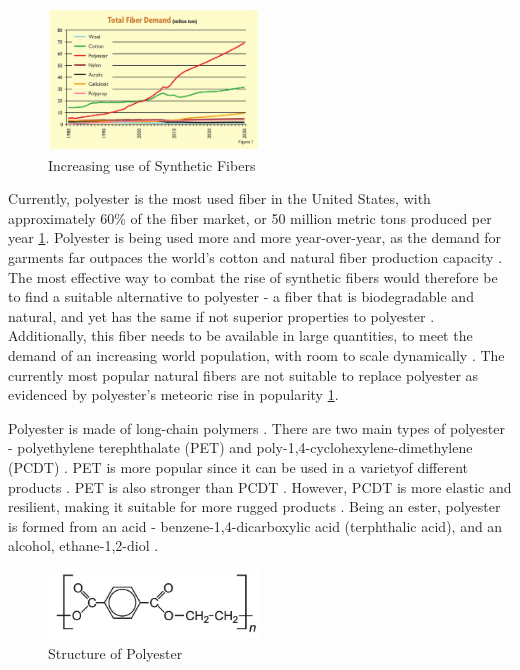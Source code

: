 \documentclass{article}
\begin{document}
\begin{figure}
  \centering
  \includegraphics[width=0.5\textwidth]{assets/polyester_rise.jpg}
  \caption{Increasing use of Synthetic Fibers \protect\autocite{globaltradeanalysis}}
  \label{fig:syntheticfiberuse}
\end{figure}

Currently, polyester is the most used fiber in the United States, with approximately 60\% of the fiber market, or 50 million metric tons produced per year \ref{fig:syntheticfiberuse}\autocite{globaltradeanalysis}. Polyester is being used more and more year-over-year, as the demand for garments far outpaces the world's cotton and natural fiber production capacity \autocite{globaltradeanalysis}. The most effective way to combat the rise of synthetic fibers would therefore be to find a suitable alternative to polyester - a fiber that is biodegradable and natural, and yet has the same if not superior properties to polyester \autocite{naturalfiberprogressreport}. Additionally, this fiber needs to be available in large quantities, to meet the demand of an increasing world population, with room to scale dynamically \autocite{grandviewresearch}. The currently most popular natural fibers are not suitable to replace polyester as evidenced by polyester's meteoric rise in popularity \ref{fig:syntheticfiberuse}.

Polyester is made of long-chain polymers \autocite{polyesterstrength}. There are two main types of polyester - polyethylene terephthalate (PET) and poly-1,4-cyclohexylene-dimethylene (PCDT) \autocite{polyesterstrength}. PET is more popular since it can be used in a varietyof different products \autocite{polyesterstrength}. PET is also stronger than PCDT \autocite{craftechindustries}. However, PCDT is more elastic and resilient, making it suitable for more rugged products \autocite{polyesterstrength}. Being an ester, polyester is formed from an acid - benzene-1,4-dicarboxylic acid (terphthalic acid), and an alcohol, ethane-1,2-diol \autocite{polyesterstructure}.

\begin{figure}
  \centering
  \includegraphics[width=0.5\textwidth]{assets/polyester_structure.jpg}
  \caption{Structure of Polyester \protect\autocite{polyesterstructure}}
  \label{fig:polyesterstructure}
\end{figure}
\end{document}
